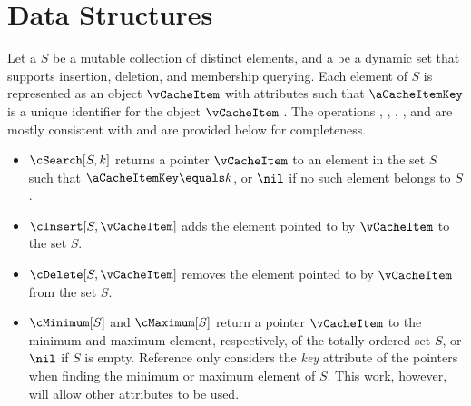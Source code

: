 \chapter{Data Structures}

\newcommand{\set}{S}

Let a  $\set$ be a mutable collection of distinct elements,
and a  be a dynamic set that supports insertion, deletion,
and membership querying. Each element of $\set$ is represented as an object
$\vCacheItem$ with attributes such that $\aCacheItemKey$ is a unique identifier
for the object $\vCacheItem$ \cite[p. 249]{Cormen2022}. The operations
\cSearch, \cInsert, \cDelete, \cMinimum, and \cMaximum{} are mostly consistent
with \cite[p. 250]{Cormen2022} and are provided below for completeness.
\begin{itemize}
    \item $\cSearch[S, k]$ returns a pointer $\vCacheItem$ to an element in the
    set $\set$ such that $\aCacheItemKey \equals k$, or $\nil$ if no such
    element belongs to $\set$.
    \item $\cInsert[\set, \vCacheItem]$ adds the element pointed to by
    $\vCacheItem$ to the set $\set$.
    \item $\cDelete[\set, \vCacheItem]$ removes the element pointed to by
    $\vCacheItem$ from the set $\set$.
    \item $\cMinimum[\set]$ and $\cMaximum[\set]$ return a pointer
    $\vCacheItem$ to the minimum and maximum element, respectively, of the
    totally ordered set $\set$, or $\nil$ if $\set$ is empty. Reference
    \cite{Cormen2022} only considers the \emph{key} attribute of the pointers
    when finding the minimum or maximum element of $\set$. This work, however,
    will allow other attributes to be used.
\end{itemize}